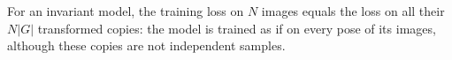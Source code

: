 \documentclass[aps,pra,reprint,superscriptaddress,longbibliography]{revtex4-2}
\begin{document}
For an invariant model, the training loss on $N$ images equals the loss on all their $N|G|$ transformed copies: the model is trained as if on every pose of its images, although these copies are not independent samples.
\end{document}
